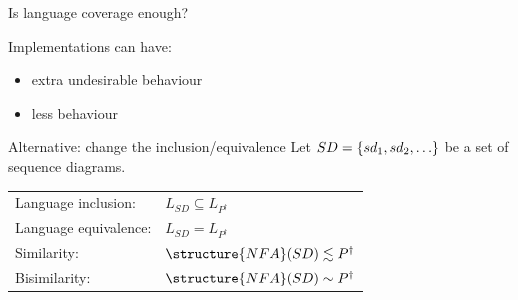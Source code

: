 \documentclass[aspectratio=169]{beamer}
\begin{document}
\begin{slide}{Is language coverage enough?} \centering
  \centering

  \begin{block}{Implementations can have:}
  \begin{itemize}
    \item extra undesirable behaviour
    \item less behaviour
  \end{itemize}
  \end{block}

  \begin{block}{Alternative: change the inclusion/equivalence}
  Let $SD = \left\{ sd_1,sd_2,\ldots \right\}$ be a set of sequence diagrams.
  \\[3mm]
  \begin{tabular}{ll}
  \alert{Language inclusion:} & $L_{SD} \subseteq L_{P^{\dagger}}$
  \\
  \alert{Language equivalence:} & $L_{SD} = L_{P^{\dagger}}$
  \\
  \alert{Similarity:} & $\structure{NFA}(SD) \lesssim P^{\dagger}$
  \\
  \alert{Bisimilarity:} & $\structure{NFA}(SD) \sim P^{\dagger}$    
  \end{tabular}
  \end{block}



  

\end{slide}
\end{document}
